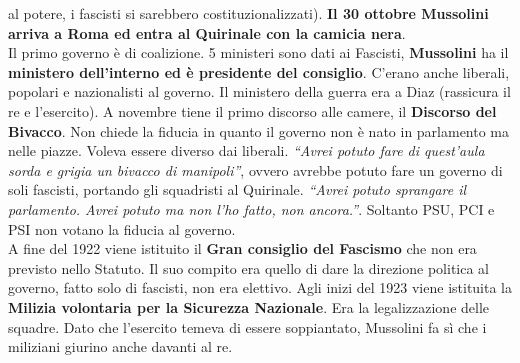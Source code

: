 al potere, i fascisti si sarebbero costituzionalizzati). \textbf{Il 30 ottobre Mussolini arriva a
Roma ed entra al Quirinale con la camicia nera}.\\
Il primo governo è di coalizione. 5 ministeri sono dati ai Fascisti, \textbf{Mussolini} ha il 
\textbf{ministero dell'interno ed è presidente del consiglio}. C'erano anche liberali, popolari e
nazionalisti al governo. Il ministero della guerra era a Diaz (rassicura il re e l'esercito). A
novembre tiene il primo discorso alle camere, il \textbf{Discorso del Bivacco}. Non chiede la fiducia
in quanto il governo non è nato in parlamento ma nelle piazze. Voleva essere diverso dai liberali.
\textit{``Avrei potuto fare di quest'aula sorda e grigia un bivacco di manipoli''}, ovvero avrebbe
potuto fare un governo di soli fascisti, portando gli squadristi al Quirinale. \textit{``Avrei potuto
sprangare il parlamento. Avrei potuto ma non l'ho fatto, non ancora.''}. Soltanto PSU, PCI e PSI non
votano la fiducia al governo.\\ [\baselineskip]
A fine del 1922 viene istituito il \textbf{Gran consiglio del Fascismo} che non era previsto nello
Statuto. Il suo compito era quello di dare la direzione politica al governo, fatto solo di fascisti,
non era elettivo. Agli inizi del 1923 viene istituita la \textbf{Milizia volontaria per la Sicurezza
Nazionale}. Era la legalizzazione delle squadre. Dato che l'esercito temeva di essere soppiantato,
Mussolini fa sì che i miliziani giurino anche davanti al re.

